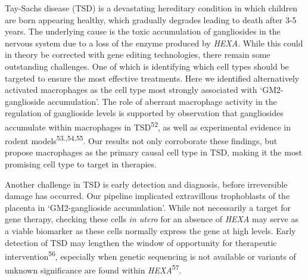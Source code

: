 \documentclass[
]{report}
\begin{document}
Tay-Sachs disease (TSD) is a devastating hereditary condition in which
children are born appearing healthy, which gradually degrades leading to
death after 3-5 years. The underlying cause is the toxic accumulation of
gangliosides in the nervous system due to a loss of the enzyme produced
by \emph{HEXA}. While this could in theory be corrected with gene
editing technologies, there remain some outstanding challenges. One of
which is identifying which cell types should be targeted to ensure the
most effective treatments. Here we identified alternatively activated
macrophages as the cell type most strongly associated with
`GM2-ganglioside accumulation'. The role of aberrant macrophage activity
in the regulation of ganglioside levels is supported by observation that
gangliosides accumulate within macrophages in TSD\textsuperscript{52},
as well as experimental evidence in rodent
models\textsuperscript{53.,54,55}. Our results not only corroborate
these findings, but propose macrophages as the primary causal cell type
in TSD, making it the most promising cell type to target in therapies.

Another challenge in TSD is early detection and diagnosis, before
irreversible damage has occurred. Our pipeline implicated extravillous
trophoblasts of the placenta in `GM2-ganglioside accumulation'. While
not necessarily a target for gene therapy, checking these cells \emph{in
utero} for an absence of \emph{HEXA} may serve as a viable biomarker as
these cells normally express the gene at high levels. Early detection of
TSD may lengthen the window of opportunity for therapeutic
intervention\textsuperscript{56}, especially when genetic sequencing is
not available or variants of unknown significance are found within
\emph{HEXA}\textsuperscript{57}.
\end{document}

